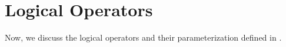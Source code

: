 \section{Logical Operators}



Now, we discuss the logical operators and their parameterization defined in \projx.

\vspace{1em}

